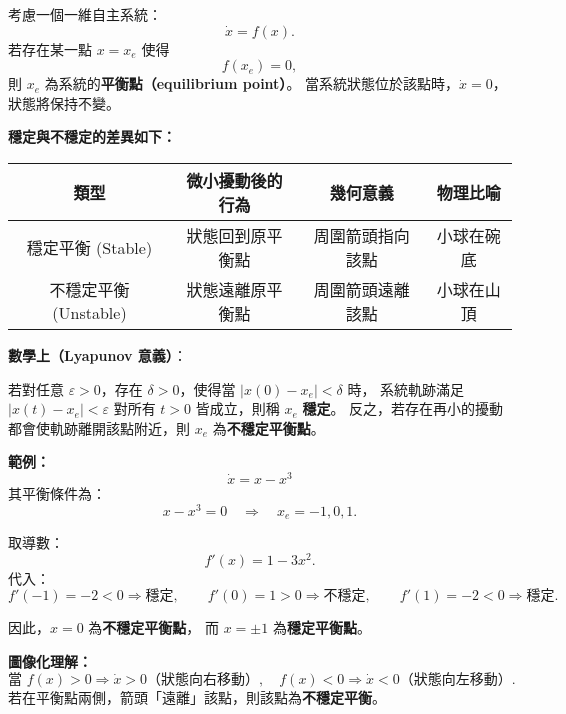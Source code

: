 \documentclass{article}
\begin{document}
\bigskip
\noindent
考慮一個一維自主系統：
\[
\dot{x} = f(x).
\]
若存在某一點 $x = x_e$ 使得
\[
f(x_e) = 0,
\]
則 $x_e$ 為系統的\textbf{平衡點（equilibrium point）}。  
當系統狀態位於該點時，$\dot{x}=0$，狀態將保持不變。

\bigskip
\noindent
\textbf{穩定與不穩定的差異如下：}

\begin{center}
\begin{tabular}{|c|c|c|c|}
\hline
\textbf{類型} & \textbf{微小擾動後的行為} & \textbf{幾何意義} & \textbf{物理比喻} \\
\hline
穩定平衡 (Stable) & 狀態回到原平衡點 & 周圍箭頭指向該點 & 小球在碗底 \\
\hline
不穩定平衡 (Unstable) & 狀態遠離原平衡點 & 周圍箭頭遠離該點 & 小球在山頂 \\
\hline
\end{tabular}
\end{center}

\bigskip
\noindent
\textbf{數學上（Lyapunov 意義）}：

若對任意 $\varepsilon > 0$，存在 $\delta > 0$，使得當 $|x(0) - x_e| < \delta$ 時，  
系統軌跡滿足 $|x(t) - x_e| < \varepsilon$ 對所有 $t > 0$ 皆成立，則稱 $x_e$ \textbf{穩定}。  
反之，若存在再小的擾動都會使軌跡離開該點附近，則 $x_e$ 為\textbf{不穩定平衡點}。

\bigskip
\noindent
\textbf{範例：}
\[
\dot{x} = x - x^3
\]
其平衡條件為：
\[
x - x^3 = 0 \quad \Rightarrow \quad x_e = -1, 0, 1.
\]

取導數：
\[
f'(x) = 1 - 3x^2.
\]
代入：
\[
f'(-1) = -2 < 0 \Rightarrow \text{穩定}, \qquad
f'(0) = 1 > 0 \Rightarrow \text{不穩定}, \qquad
f'(1) = -2 < 0 \Rightarrow \text{穩定}.
\]

因此，$x=0$ 為\textbf{不穩定平衡點}，
而 $x=\pm1$ 為\textbf{穩定平衡點}。

\bigskip
\noindent
\textbf{圖像化理解：}
\[
\text{當 } f(x)>0 \Rightarrow \dot{x}>0 \text{（狀態向右移動）}, \quad
f(x)<0 \Rightarrow \dot{x}<0 \text{（狀態向左移動）}.
\]
若在平衡點兩側，箭頭「遠離」該點，則該點為\textbf{不穩定平衡}。
\end{document}
